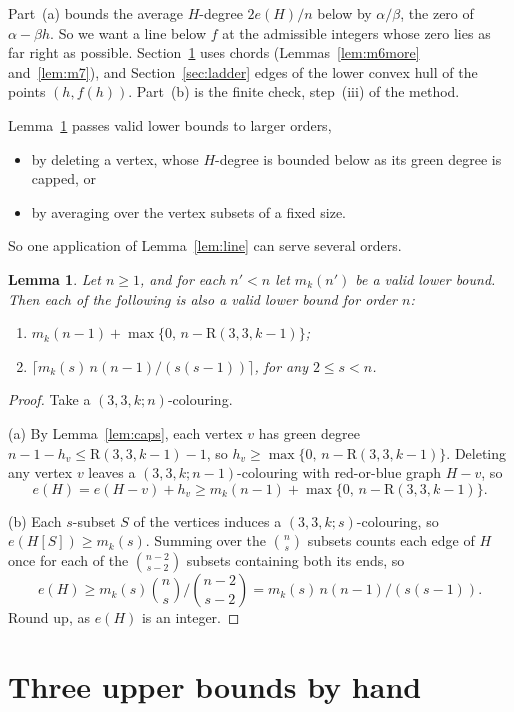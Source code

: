 \documentclass[11pt]{article}
\theoremstyle{spacedplain}
\newtheorem{lemma}[theorem]{Lemma}
\theoremstyle{spaceddef}
\theoremstyle{spacedremark}
\newcommand{\R}{\mathrm{R}}
\begin{document}
Part~(a) bounds the average $H$-degree $2e(H)/n$ below by $\alpha/\beta$, the zero of $\alpha-\beta h$.
So we want a line below $f$ at the admissible integers whose zero lies as far right as possible.
Section~\ref{sec:three} uses chords (Lemmas~\ref{lem:m6more} and~\ref{lem:m7}), and Section~\ref{sec:ladder} edges of the lower convex hull of the points $(h,f(h))$.
Part~(b) is the finite check, step~(iii) of the method.

Lemma~\ref{lem:delete} passes valid lower bounds to larger orders,
\begin{itemize}
\item by deleting a vertex, whose $H$-degree is bounded below as its green degree is capped, or
\item by averaging over the vertex subsets of a fixed size.
\end{itemize}
So one application of Lemma~\ref{lem:line} can serve several orders.

\begin{lemma}\label{lem:delete}
Let $n\ge 1$, and for each $n'<n$ let $m_k(n')$ be a valid lower bound.
Then each of the following is also a valid lower bound for order $n$:
\begin{enumerate}[label=(\alph*)]
\item $m_k(n-1)+\max\{0,\,n-\R(3,3,k-1)\}$;
\item $\big\lceil m_k(s)\,n(n-1)/(s(s-1))\big\rceil$, for any $2\le s<n$.
\end{enumerate}
\end{lemma}

\begin{proof}
Take a $(3,3,k;n)$-colouring.

(a) By Lemma~\ref{lem:caps}, each vertex $v$ has green degree $n-1-h_v\le\R(3,3,k-1)-1$, so $h_v\ge\max\{0,\,n-\R(3,3,k-1)\}$.
Deleting any vertex $v$ leaves a $(3,3,k;n-1)$-colouring with red-or-blue graph $H-v$, so
\[
e(H)=e(H-v)+h_v\ge m_k(n-1)+\max\{0,\,n-\R(3,3,k-1)\}.
\]

(b) Each $s$-subset $S$ of the vertices induces a $(3,3,k;s)$-colouring, so $e(H[S])\ge m_k(s)$.
Summing over the $\binom ns$ subsets counts each edge of $H$ once for each of the $\binom{n-2}{s-2}$ subsets containing both its ends, so
\[
e(H)\ge m_k(s)\binom ns\Big/\binom{n-2}{s-2}=m_k(s)\,n(n-1)/(s(s-1)).
\]
Round up, as $e(H)$ is an integer.
\end{proof}

\section{Three upper bounds by hand}\label{sec:three}
\end{document}
